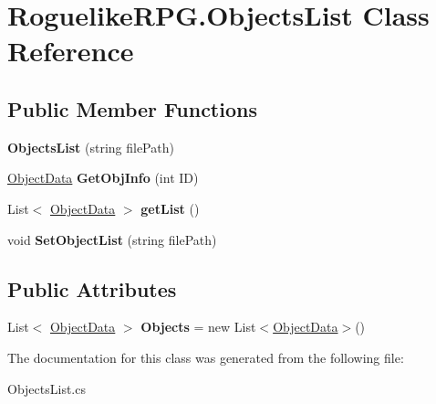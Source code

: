 \hypertarget{class_roguelike_r_p_g_1_1_objects_list}{}\section{Roguelike\+R\+P\+G.\+Objects\+List Class Reference}
\label{class_roguelike_r_p_g_1_1_objects_list}
\subsection*{Public Member Functions}
\begin{DoxyCompactItemize}
\item 
\mbox{\label{class_roguelike_r_p_g_1_1_objects_list_a3f9529f0320855dc4e2c319c41b0fa11}} 
{\bfseries Objects\+List} (string file\+Path)
\item 
\mbox{\label{class_roguelike_r_p_g_1_1_objects_list_a3ba42889c151f1600ae85d3f6c4fdd04}} 
\mbox{\hyperlink{struct_roguelike_r_p_g_1_1_object_data}{Object\+Data}} {\bfseries Get\+Obj\+Info} (int ID)
\item 
\mbox{\label{class_roguelike_r_p_g_1_1_objects_list_a3fdfb2e43360231f85bcd5d54c934c89}} 
List$<$ \mbox{\hyperlink{struct_roguelike_r_p_g_1_1_object_data}{Object\+Data}} $>$ {\bfseries get\+List} ()
\item 
\mbox{\label{class_roguelike_r_p_g_1_1_objects_list_ae1dae2b167a94e28aea2fb7b3627ee0d}} 
void {\bfseries Set\+Object\+List} (string file\+Path)
\end{DoxyCompactItemize}
\subsection*{Public Attributes}
\begin{DoxyCompactItemize}
\item 
\mbox{\label{class_roguelike_r_p_g_1_1_objects_list_a0605770d4aa6742b331e905b3da7f5d4}} 
List$<$ \mbox{\hyperlink{struct_roguelike_r_p_g_1_1_object_data}{Object\+Data}} $>$ {\bfseries Objects} = new List$<$\mbox{\hyperlink{struct_roguelike_r_p_g_1_1_object_data}{Object\+Data}}$>$()
\end{DoxyCompactItemize}


The documentation for this class was generated from the following file\+:\begin{DoxyCompactItemize}
\item 
Objects\+List.\+cs\end{DoxyCompactItemize}

